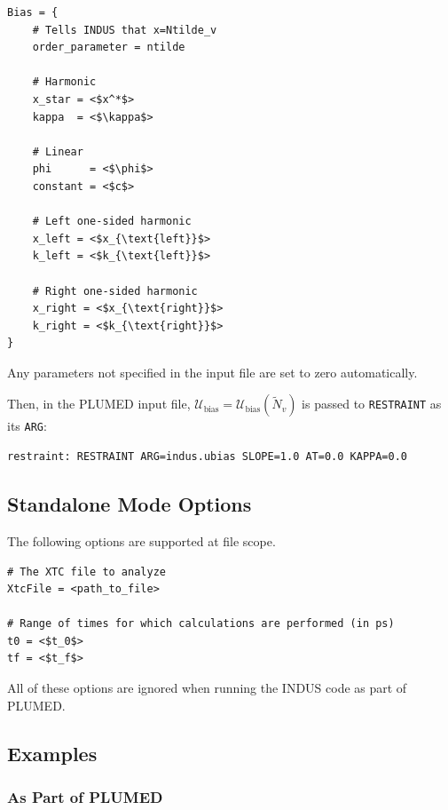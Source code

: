 \documentclass[11pt,notitlepage]{article}
\begin{document}
\begin{lstlisting}
Bias = {
	# Tells INDUS that x=Ntilde_v
	order_parameter = ntilde

	# Harmonic
	x_star = <$x^*$>
	kappa  = <$\kappa$>

	# Linear
	phi      = <$\phi$>
	constant = <$c$>

	# Left one-sided harmonic
	x_left = <$x_{\text{left}}$>
	k_left = <$k_{\text{left}}$>

	# Right one-sided harmonic
	x_right = <$x_{\text{right}}$>
	k_right = <$k_{\text{right}}$>
}
\end{lstlisting}

\noindent Any parameters not specified in the input file are set to zero automatically.


Then, in the PLUMED input file, $\mathcal{U}_{\text{bias}} = \mathcal{U}_{\text{bias}}(\tilde{N}_v)$ is passed to \texttt{RESTRAINT} as its \texttt{ARG}:

\begin{lstlisting}
restraint: RESTRAINT ARG=indus.ubias SLOPE=1.0 AT=0.0 KAPPA=0.0
\end{lstlisting}


\subsection{Standalone Mode Options}{\label{sec:input_standalone}}

The following options are supported at file scope.

\begin{lstlisting}
# The XTC file to analyze
XtcFile = <path_to_file>

# Range of times for which calculations are performed (in ps)
t0 = <$t_0$>
tf = <$t_f$>
\end{lstlisting}

\noindent All of these options are ignored when running the INDUS code as part of PLUMED.


\subsection{Examples}


\subsubsection{As Part of PLUMED}
\end{document}
